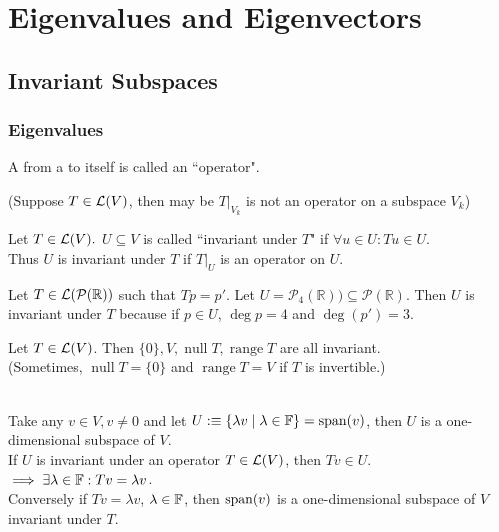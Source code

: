 \chapter{Eigenvalues and Eigenvectors}
\section{Invariant Subspaces}
\subsection{Eigenvalues}

\begin{mydef}
    A \lm from a \vs to itself is called an ``operator". 
\end{mydef}

(Suppose $T\in \mathcal{L}(V)$, then may be $\left.T\right|_{V_{k}}$ is not an operator on a subspace $V_k$)

\begin{mydef}
    Let $T\in \mathcal{L}(V).$ $U \subseteq V$ is called ``invariant under $T$" if $\forall u \in U: Tu \in U.$ \\
    Thus $U$ is invariant under $T$ if $\left.T\right|_{U}$ is an operator on $U.$
\end{mydef}

\begin{example}
    Let $T\in \mathcal{L}(\mathcal{P}(\mathbb{R}))$ such that $Tp=p'.$ Let $U=\mathcal{P}_4(\mathbb{R})) \subseteq \mathcal{P}(\mathbb{R}).$ Then $U$ is invariant under $T$
    because if $p \in U$, $\deg p = 4$ and $\deg (p')=3$.
\end{example}

\begin{example}
    Let $T\in \mathcal{L}(V)$. Then $\{0\}, V, \operatorname{null} T, \operatorname{range} T$ are all invariant. \\
    (Sometimes, $\operatorname{null} T = \{0\}$ and $\operatorname{range} T=V$ if $T$ is invertible.)
\end{example}

 \\
Take any $v\in V, v\neq 0$ and let $U :\equiv \{  \lambda v \mid \lambda \in {\mathbb{F}} \} = \operatorname{span} (v)$, then $U$ is a one-dimensional subspace of $V$. \\
If $U$ is invariant under an operator $T \in \mathcal{L} (V)$, then $Tv  \in U$. $\implies \exists \lambda \in {\mathbb{F}}: Tv = \lambda v$. \\
Conversely if $Tv = \lambda v$, $\lambda \in {\mathbb{F}}$, then $\operatorname{span} (v)$ is a one-dimensional subspace of $V$ invariant under $T$. 

